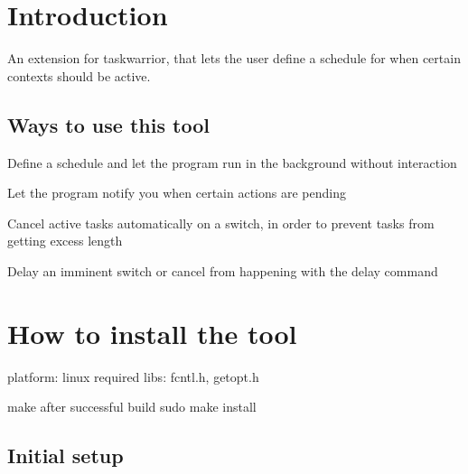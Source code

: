 \hypertarget{index_intro_sec}{}\section{Introduction}\label{index_intro_sec}
An extension for taskwarrior, that lets the user define a schedule for when certain contexts should be active.\hypertarget{index_intro_sub}{}\subsection{Ways to use this tool}\label{index_intro_sub}

\begin{DoxyItemize}
\item Define a schedule and let the program run in the background without interaction
\item Let the program notify you when certain actions are pending
\item Cancel active tasks automatically on a switch, in order to prevent tasks from getting excess length
\item Delay an imminent switch or cancel from happening with the delay command
\end{DoxyItemize}\hypertarget{index_install_sec}{}\section{How to install the tool}\label{index_install_sec}
platform\+: linux required libs\+: fcntl.\+h, getopt.\+h

make after successful build sudo make install\hypertarget{index_first_setup}{}\subsection{Initial setup}\label{index_first_setup}

